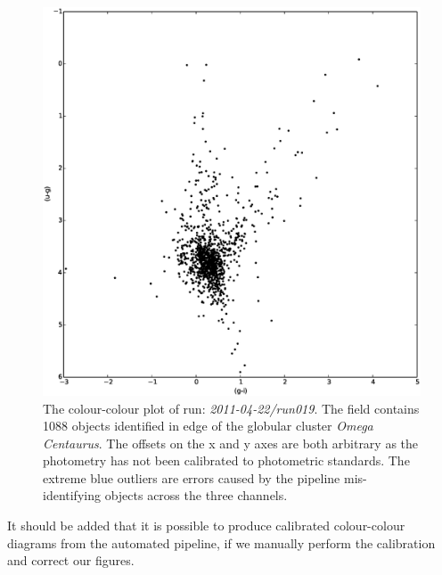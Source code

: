 \begin{figure}
\centering
\includegraphics[width=120mm]{images//2011-04-22-run019-omegacen-2colour.eps}
\caption{The colour-colour plot of run: \emph{2011-04-22/run019}. The field contains 1088 objects identified in edge of the globular cluster \emph{Omega Centaurus}. The offsets on the x and y axes are both arbitrary as the photometry has not been calibrated to photometric standards. The extreme blue outliers are errors caused by the pipeline mis-identifying objects across the three channels.}
\label{fig:differentialtrad}
\end{figure}

It should be added that it is possible to produce calibrated colour-colour diagrams from the automated pipeline, if we manually perform the calibration and correct our figures. 
